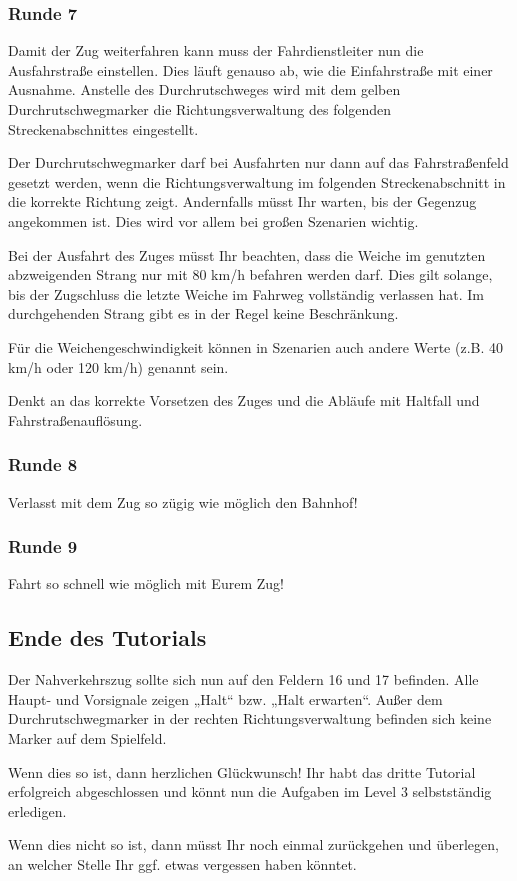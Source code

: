 \subsubsection*{Runde 7}
  Damit der Zug weiterfahren kann muss der Fahrdienstleiter nun die Ausfahrstraße einstellen. Dies läuft genauso ab, wie die Einfahrstraße mit einer Ausnahme. Anstelle des Durchrutschweges wird mit dem gelben Durchrutschwegmarker die Richtungsverwaltung des folgenden Streckenabschnittes eingestellt.
  \begin{framed}\noindent
    Der Durchrutschwegmarker darf bei Ausfahrten nur dann auf das Fahrstraßenfeld gesetzt werden, wenn die Richtungsverwaltung im folgenden Streckenabschnitt in die korrekte Richtung zeigt. Andernfalls müsst Ihr warten, bis der Gegenzug angekommen ist. Dies wird vor allem bei großen Szenarien wichtig.
  \end{framed}
  Bei der Ausfahrt des Zuges müsst Ihr beachten, dass die Weiche im genutzten abzweigenden Strang nur mit 80 km/h befahren werden darf. Dies gilt solange, bis der Zugschluss die letzte Weiche im Fahrweg vollständig verlassen hat. Im durchgehenden Strang gibt es in der Regel keine Beschränkung.
  \begin{framed}\noindent
    Für die Weichengeschwindigkeit können in Szenarien auch andere Werte (z.B. 40 km/h oder 120 km/h) genannt sein.
  \end{framed}
  Denkt an das korrekte Vorsetzen des Zuges und die Abläufe mit Haltfall und Fahrstraßenauflösung.


\subsubsection*{Runde 8}
  Verlasst mit dem Zug so zügig wie möglich den Bahnhof!


\subsubsection*{Runde 9}
  Fahrt so schnell wie möglich mit Eurem Zug!


\subsection*{Ende des Tutorials}
  Der Nahverkehrszug sollte sich nun auf den Feldern 16 und 17 befinden. Alle  Haupt- und Vorsignale zeigen „Halt“ bzw. „Halt erwarten“. Außer dem Durchrutschwegmarker in der rechten Richtungsverwaltung befinden sich keine Marker auf dem Spielfeld.
  \begin{framed}\noindent
    Wenn dies so ist, dann herzlichen Glückwunsch! Ihr habt das dritte Tutorial erfolgreich abgeschlossen und könnt nun die Aufgaben im Level 3 selbstständig erledigen.
  \end{framed}
  \begin{framed}\noindent
    Wenn dies nicht so ist, dann müsst Ihr noch einmal zurückgehen und überlegen, an welcher Stelle Ihr ggf. etwas vergessen haben könntet.
  \end{framed}
